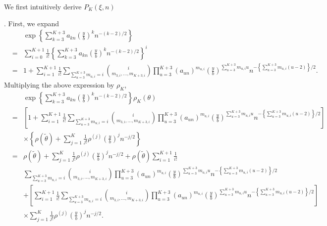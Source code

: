 We first intuitively derive $P_{K}\left(\xi,n\right)$ %
\begin{comment}
add expansion polynomial
\end{comment}
. First, we expand 
\begin{eqnarray*}
 &  & \exp\left\{ \sum_{k=3}^{K+3}a_{kn}\left(\frac{y}{b}\right)^{k}n^{-\left(k-2\right)/2}\right\} \\
 & = & \sum_{i=0}^{K+1}\frac{1}{i!}\left\{ \sum_{k=3}^{K+3}a_{kn}\left(\frac{y}{b}\right)^{k}n^{-\left(k-2\right)/2}\right\} ^{i}\\
 & = & 1+\sum_{i=1}^{K+1}\frac{1}{i!}\sum_{\sum_{u=3}^{K+3}m_{u,i}=i}\binom{i}{m_{3,i},\ldots,m_{K+3,i}}\prod_{u=3}^{K+3}\left(a_{un}\right)^{m_{u,i}}\left(\frac{y}{b}\right)^{\sum_{u=3}^{K+3}m_{u,i}u}n^{-\left\{ \sum_{u=3}^{K+3}m_{u,i}\left(u-2\right)\right\} /2}.
\end{eqnarray*}
Multiplying the above expression by $\rho_{K}$, 
\begin{eqnarray*}
 &  & \exp\left\{ \sum_{k=3}^{K+3}a_{kn}\left(\frac{y}{b}\right)^{k}n^{-\left(k-2\right)/2}\right\} \rho_{K}\left(\theta\right)\\
 & = & \left[1+\sum_{i=1}^{K+1}\frac{1}{i!}\sum_{\sum_{u=3}^{K+3}m_{u,i}=i}\binom{i}{m_{3,i},\ldots,m_{K+3,i}}\prod_{u=3}^{K+3}\left(a_{un}\right)^{m_{u,i}}\left(\frac{y}{b}\right)^{\sum_{u=3}^{K+3}m_{u,i}u}n^{-\left\{ \sum_{u=3}^{K+3}m_{u,i}\left(u-2\right)\right\} /2}\right]\\
 &  & \times\left\{ \rho\left(\tilde{\theta}\right)+\sum_{j=1}^{K}\frac{1}{j!}\rho^{\left(j\right)}\left(\frac{y}{b}\right)^{j}n^{-j/2}\right\} \\
 & = & \rho\left(\tilde{\theta}\right)+\sum_{j=1}^{K}\frac{1}{j!}\rho^{\left(j\right)}\left(\frac{y}{b}\right)^{j}n^{-j/2}+\rho\left(\tilde{\theta}\right)\sum_{i=1}^{K+1}\frac{1}{i!}\\
 &  & \sum_{\sum_{u=3}^{K+3}m_{u,i}=i}\binom{i}{m_{3,i},\ldots,m_{K+3,i}}\prod_{u=3}^{K+3}\left(a_{un}\right)^{m_{u,i}}\left(\frac{y}{b}\right)^{\sum_{u=3}^{K+3}m_{u,i}u}n^{-\left\{ \sum_{u=3}^{K+3}m_{u,i}\left(u-2\right)\right\} /2}\\
 &  & +\left[\sum_{i=1}^{K+1}\frac{1}{i!}\sum_{\sum_{u=3}^{K+3}m_{u,i}=i}\binom{i}{m_{3,i},\ldots,m_{K+3,i}}\prod_{u=3}^{K+3}\left(a_{un}\right)^{m_{u,i}}\left(\frac{y}{b}\right)^{\sum_{u=3}^{K+3}m_{u,i}u}n^{-\left\{ \sum_{u=3}^{K+3}m_{u,i}\left(u-2\right)\right\} /2}\right]\\
 &  & \times\sum_{j=1}^{K}\frac{1}{j!}\rho^{\left(j\right)}\left(\frac{y}{b}\right)^{j}n^{-j/2}.
\end{eqnarray*}
